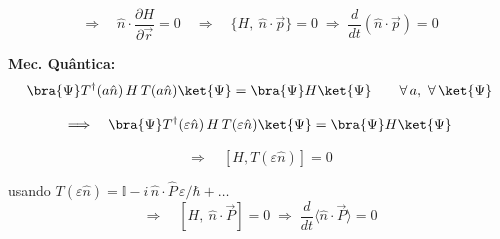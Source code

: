 \begin{equation}
    \Longrightarrow \quad \hat{n}\cdot\frac{\partial H}{\partial \vec{r}} = 0
    \quad \Longrightarrow \quad
    \boxed{\{H,\ \hat{n}\cdot\vec{p}\} = 0 \;\Longrightarrow\; \frac{d}{dt}(\hat{n}\cdot\vec{p}) = 0}
\label{eq:aula21_transl_mc_final}
\end{equation}

\textbf{Mec. Quântica:}
\begin{equation}
    \bra{\Psi} T^{\dagger}(a\hat{n})\, H\, T(a\hat{n}) \ket{\Psi} = \bra{\Psi} H \ket{\Psi} \qquad \forall\,a,\ \forall\,\ket{\Psi}
\label{eq:aula21_transl_mq_1}
\end{equation}

\begin{equation}
    \Longrightarrow \quad \bra{\Psi} T^{\dagger}(\varepsilon\hat{n})\, H\, T(\varepsilon\hat{n}) \ket{\Psi} = \bra{\Psi} H \ket{\Psi}
\label{eq:aula21_transl_mq_2}
\end{equation}

\begin{equation}
    \Longrightarrow \quad [H, T(\varepsilon\hat{n})] = 0
\label{eq:aula21_transl_mq_3}
\end{equation}

usando $T(\varepsilon\hat{n}) = \mathbb{I} - i\,\hat{n}\cdot\hat{P}\,\varepsilon/\hbar + \dots$
\begin{equation}
    \Longrightarrow \quad \boxed{[H,\ \hat{n}\cdot\vec{P}] = 0 \;\Longrightarrow\; \frac{d}{dt}\langle \hat{n}\cdot\vec{P} \rangle = 0}
\label{eq:aula21_transl_mq_final}
\end{equation}

